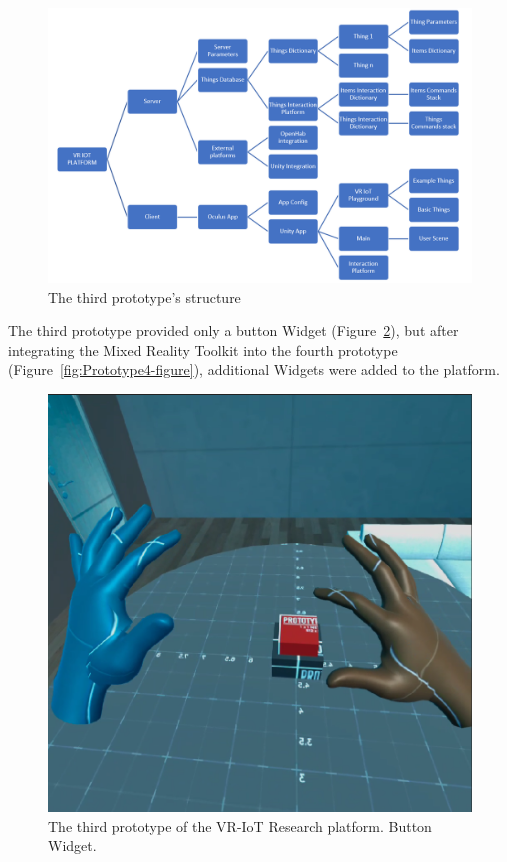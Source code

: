 \begin{figure}
  \centering
  \includegraphics[width=0.9\linewidth]{figures/Prototype3Structure.png}
  \caption{The third prototype's structure}
  \label{fig:Prototype3Structure-figure}
\end{figure}

The third prototype provided only a button Widget (Figure~\ref{fig:Prototype3-figure}), but after integrating the Mixed Reality Toolkit into the fourth prototype (Figure~\ref{fig:Prototype4-figure}), additional Widgets were added to the platform. 

\begin{figure}
  \centering
  \includegraphics[width=0.6\linewidth]{figures/Prototype3.png}
  \caption{The third prototype of the VR-IoT Research platform. Button Widget.}
  \label{fig:Prototype3-figure}
\end{figure}

